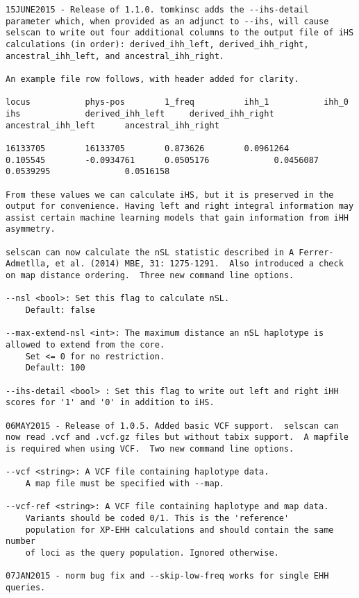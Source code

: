 \documentclass[12pt]{article}%
\begin{document}
\begin{lstlisting}
15JUNE2015 - Release of 1.1.0. tomkinsc adds the --ihs-detail parameter which, when provided as an adjunct to --ihs, will cause selscan to write out four additional columns to the output file of iHS calculations (in order): derived_ihh_left, derived_ihh_right, ancestral_ihh_left, and ancestral_ihh_right.

An example file row follows, with header added for clarity.

locus           phys-pos        1_freq          ihh_1           ihh_0           ihs             derived_ihh_left     derived_ihh_right    ancestral_ihh_left      ancestral_ihh_right

16133705        16133705        0.873626        0.0961264       0.105545        -0.0934761      0.0505176             0.0456087           0.0539295               0.0516158

From these values we can calculate iHS, but it is preserved in the output for convenience. Having left and right integral information may assist certain machine learning models that gain information from iHH asymmetry. 

selscan can now calculate the nSL statistic described in A Ferrer-Admetlla, et al. (2014) MBE, 31: 1275-1291.  Also introduced a check on map distance ordering.  Three new command line options.

--nsl <bool>: Set this flag to calculate nSL.
	Default: false

--max-extend-nsl <int>: The maximum distance an nSL haplotype is allowed to extend from the core.
	Set <= 0 for no restriction.
	Default: 100

--ihs-detail <bool> : Set this flag to write out left and right iHH scores for '1' and '0' in addition to iHS.

06MAY2015 - Release of 1.0.5. Added basic VCF support.  selscan can now read .vcf and .vcf.gz files but without tabix support.  A mapfile is required when using VCF.  Two new command line options.

--vcf <string>: A VCF file containing haplotype data.
	A map file must be specified with --map.

--vcf-ref <string>: A VCF file containing haplotype and map data.
	Variants should be coded 0/1. This is the 'reference'
	population for XP-EHH calculations and should contain the same number
	of loci as the query population. Ignored otherwise.

07JAN2015 - norm bug fix and --skip-low-freq works for single EHH queries.


\end{lstlisting}
\end{document}
